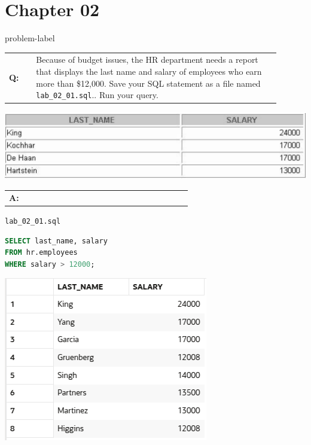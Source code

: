 \newpage
\section*{Chapter 02}
{}
\setcounter{problem}{0}


\begin{problem}{}{problem-label}

\begin{tabular}{@{}l p{0.9\linewidth}@{}}
  \textbf{Q:} & Because of budget issues, the HR department needs a report that displays the last name and
salary of employees who earn more than \$12,000. Save your SQL statement as a file named \texttt{lab\_02\_01.sql}.. Run your query. 
\end{tabular}

\begin{center}
  \includegraphics[scale=0.8]{images/c2q1.png}
\end{center}

\begin{tabular}{@{}l p{0.9\linewidth}@{}}
  \textbf{A:} &
\end{tabular}

\hspace{1.5em}\texttt{lab\_02\_01.sql}
\begin{lstlisting}[language=SQL]
SELECT last_name, salary
FROM hr.employees
WHERE salary > 12000;
\end{lstlisting}

\vspace{1em}

\begin{center}
  \includegraphics[scale=0.8]{images/c2a1.png}
\end{center}

\end{problem}

